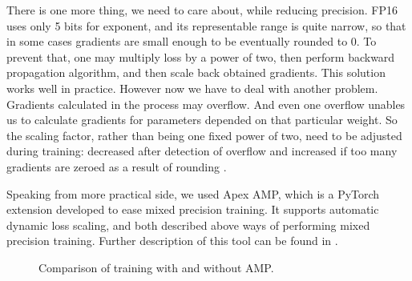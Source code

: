 \documentclass[licencjacka,en]{pracamgr}
\begin{document}
	There is one more thing, we need to care about, while reducing precision. FP16 uses only 5 bits for exponent, and its representable range is quite narrow, so that in some cases gradients are small enough to be eventually rounded to 0. To prevent that, one may multiply loss by a power of two, then perform backward propagation algorithm, and then scale back obtained gradients. This solution works well in practice. However now we have to deal with another problem. Gradients calculated in the process may overflow. And even one overflow unables us to calculate gradients for parameters depended on that particular weight. So the scaling factor, rather than being one fixed power of two, need to be adjusted during training: decreased after detection of overflow and increased if too many gradients are zeroed as a result of rounding \cite{LOSS_SCALING}.
	
	Speaking from more practical side, we used Apex AMP, which is a PyTorch extension developed to ease mixed precision training. It supports automatic dynamic loss scaling, and both described above ways of performing mixed precision training. Further description of this tool can be found in \cite{APEX_DOCS}.
	
	
	\begin{figure}[!hbt]
		\begin{center}
		\end{center}
		\caption{Comparison of training with and without AMP.}
		\label{fig:amp}
	\end{figure}
	
\end{document}
